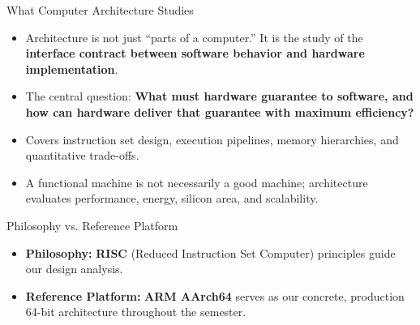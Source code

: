 \documentclass[aspectratio=169,11pt]{beamer}
\newcommand{\key}[1]{\textbf{#1}}
\begin{document}
\begin{frame}{What Computer Architecture Studies}

\begin{itemize}
  \item Architecture is not just ``parts of a computer.'' It is the study of the \key{interface contract between software behavior and hardware implementation}.
  \item The central question: \key{What must hardware guarantee to software, and how can hardware deliver that guarantee with maximum efficiency?}
  \item Covers instruction set design, execution pipelines, memory hierarchies, and quantitative trade-offs.
  \item A functional machine is not necessarily a good machine; architecture evaluates performance, energy, silicon area, and scalability.
\end{itemize}

\begin{block}{Philosophy vs. Reference Platform}
\begin{itemize}
  \item \key{Philosophy:} \textbf{RISC} (Reduced Instruction Set Computer) principles guide our design analysis.
  \item \key{Reference Platform:} \textbf{ARM AArch64} serves as our concrete, production 64-bit architecture throughout the semester.
\end{itemize}
\end{block}

\end{frame}

\end{document}
